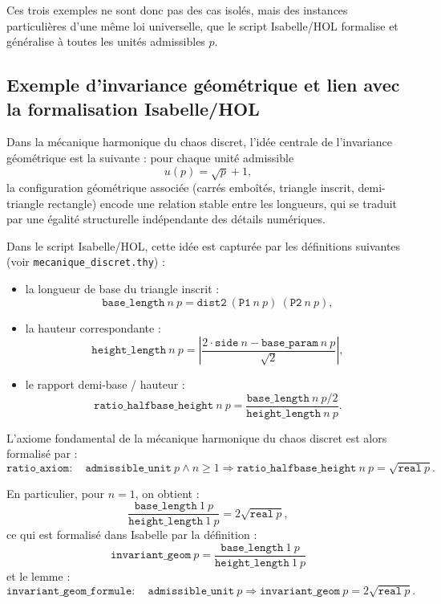 \documentclass[12pt,a4paper]{article}
\begin{document}
Ces trois exemples ne sont donc pas des cas isolés, mais des instances
particulières d'une même loi universelle, que le script Isabelle/HOL
formalise et généralise à toutes les unités admissibles $p$.

\subsection{Exemple d'invariance géométrique et lien avec la formalisation Isabelle/HOL}

Dans la mécanique harmonique du chaos discret, l'idée centrale de l'invariance
géométrique est la suivante : pour chaque unité admissible
\[
  u(p) = \sqrt{p} + 1,
\]
la configuration géométrique associée (carrés emboîtés, triangle inscrit,
demi-triangle rectangle) encode une relation stable entre les longueurs, qui
se traduit par une égalité structurelle indépendante des détails numériques.

Dans le script Isabelle/HOL, cette idée est capturée par les définitions
suivantes (voir \texttt{mecanique\_discret.thy}) :
\begin{itemize}
  \item la longueur de base du triangle inscrit :
  \[
    \texttt{base\_length}\ n\ p = \texttt{dist2}\ (\texttt{P1}\ n\ p)\ (\texttt{P2}\ n\ p),
  \]
  \item la hauteur correspondante :
  \[
    \texttt{height\_length}\ n\ p =
      \left|\frac{2 \cdot \texttt{side}\ n - \texttt{base\_param}\ n\ p}{\sqrt{2}}\right|,
  \]
  \item le rapport demi-base / hauteur :
  \[
    \texttt{ratio\_halfbase\_height}\ n\ p =
      \frac{\texttt{base\_length}\ n\ p / 2}{\texttt{height\_length}\ n\ p}.
  \]
\end{itemize}

L'axiome fondamental de la mécanique harmonique du chaos discret est alors
formalisé par :
\[
  \texttt{ratio\_axiom} :
  \quad \texttt{admissible\_unit}\ p \wedge n \ge 1
  \Longrightarrow
  \texttt{ratio\_halfbase\_height}\ n\ p = \sqrt{\texttt{real}\ p}.
\]

En particulier, pour $n = 1$, on obtient :
\[
  \frac{\texttt{base\_length}\ 1\ p}{\texttt{height\_length}\ 1\ p}
  = 2 \sqrt{\texttt{real}\ p},
\]
ce qui est formalisé dans Isabelle par la définition :
\[
  \texttt{invariant\_geom}\ p =
    \frac{\texttt{base\_length}\ 1\ p}{\texttt{height\_length}\ 1\ p}
\]
et le lemme :
\[
  \texttt{invariant\_geom\_formule} :
  \quad \texttt{admissible\_unit}\ p
  \Longrightarrow
  \texttt{invariant\_geom}\ p = 2 \sqrt{\texttt{real}\ p}.
\]
\end{document}
